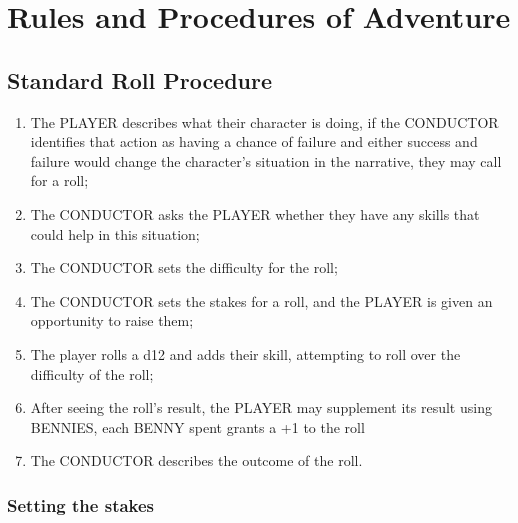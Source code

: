 \section{Rules and Procedures of Adventure}

\subsection{Standard Roll Procedure}
\begin{enumerate}
    \item {The PLAYER describes what their character is doing, if the CONDUCTOR identifies that action as having a chance of failure and either success and failure would change the character's situation in the narrative, they may call for a roll;}
    \item {The CONDUCTOR asks the PLAYER whether they have any skills that could help in this situation;}
    \item {The CONDUCTOR sets the difficulty for the roll;}
    \item {The CONDUCTOR sets the stakes for a roll, and the PLAYER is given an opportunity to raise them;}
    \item {The player rolls a d12 and adds their skill, attempting to roll over the difficulty of the roll;}
    \item {After seeing the roll's result, the PLAYER may supplement its result using BENNIES, each BENNY spent grants a +1 to the roll}
    \item {The CONDUCTOR describes the outcome of the roll.}
\end{enumerate}

\subsubsection*{Setting the stakes}

